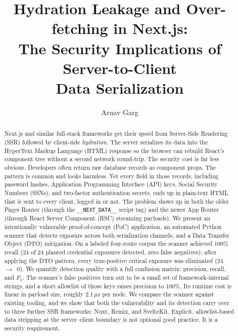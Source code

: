\documentclass[runningheads]{llncs}
\begin{document}
\title{Hydration Leakage and Over-fetching in Next.js:\\
The Security Implications of Server-to-Client\\
Data Serialization}


\author{Arnav Garg}



\maketitle

\begin{abstract}
Next.js and similar full-stack frameworks get their speed from
Server-Side Rendering (SSR) followed by client-side \emph{hydration}.
The server serializes its data into the HyperText Markup Language (HTML)
response so the browser can rebuild React's component tree without a
second network round-trip.  The security cost is far less obvious.
Developers often return raw database records as component props.  The
pattern is common and looks harmless.  Yet every field in those records,
including password hashes, Application Programming Interface (API) keys,
Social Security Numbers (SSNs), and two-factor authentication secrets,
ends up in plain-text HTML that is sent to every client, logged in or
not.  The problem shows up in both the older Pages Router (through the
\texttt{\_\_NEXT\_DATA\_\_} script tag) and the newer App Router (through
React Server Component (RSC) streaming payloads).  We present
an intentionally vulnerable proof-of-concept (PoC) application, an
automated Python scanner that detects exposure across both serialization
channels, and a Data Transfer Object (DTO) mitigation.  On a labeled
four-route corpus the scanner achieved 100\% recall (24 of 24 planted
credential exposures detected, zero false negatives); after applying the
DTO pattern, every true-positive critical exposure was eliminated
(24~$\rightarrow$~0).  We quantify detection quality with a full
confusion matrix: precision, recall, and $F_1$.  The scanner's false
positives turn out to be a small set of framework-internal strings, and a
short allowlist of those keys raises precision to 100\%.  Its runtime cost
is linear in payload size, roughly 2.1\,$\mu$s per node.  We compare the
scanner against existing tooling, and we show that both the vulnerability
and its detection carry over to three further SSR frameworks: Nuxt, Remix,
and SvelteKit.  Explicit,
allowlist-based data stripping at the server--client boundary is not
optional good practice.  It is a security requirement.
\end{abstract}
\end{document}
